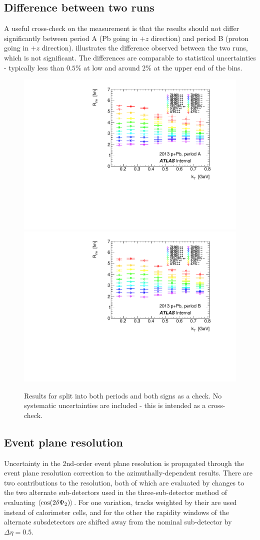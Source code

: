 \subsection{Difference between two runs}

A useful cross-check on the measurement is that the results should not differ significantly between period A (Pb going in $+z$ direction) and period B (proton going in $+z$ direction).
 illustrates the difference observed between the two runs, which is not significant.
The differences are comparable to statistical uncertainties - typically less than $0.5\%$ at low \kt and around $2\%$ at the upper end of the \kt bins.

\begin{figure}[t]
\includegraphics[width=.49\linewidth]{qinv_R_vs_kt_periodA.pdf}
\includegraphics[width=.49\linewidth]{qinv_R_vs_kt_periodB.pdf}
\caption{Results for \Rinv split into both periods and both signs as a check.
No systematic uncertainties are included - this is intended as a cross-check.}
\label{fig:fit_inv_R_split}
\end{figure}

\subsection{Event plane resolution}
Uncertainty in the 2nd-order event plane resolution is propagated through the event plane resolution correction to the azimuthally-dependent results. There are two contributions to the \psit resolution, both of which are evaluated by changes to the two alternate sub-detectors used in the three-sub-detector method of evaluating $\langle \cos(2\delta\Psi_{2}) \rangle$. For one variation, tracks weighted by their \pt are used instead of calorimeter cells, and for the other the rapidity windows of the alternate subsdetectors are shifted away from the nominal sub-detector by $\Delta\eta = 0.5$.

